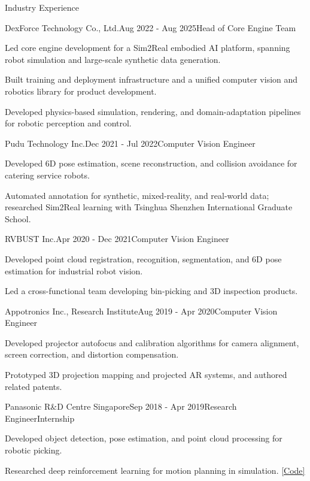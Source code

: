\documentclass{resume}
\begin{document}
\begin{rSection}{Industry Experience}
\begin{rSubsection}{DexForce Technology Co., Ltd.}{Aug 2022 - Aug 2025}{Head of Core Engine Team}{}
\item Led core engine development for a Sim2Real embodied AI platform, spanning robot simulation and large-scale synthetic data generation.
\item Built training and deployment infrastructure and a unified computer vision and robotics library for product development.
\item Developed physics-based simulation, rendering, and domain-adaptation pipelines for robotic perception and control.
\end{rSubsection}

\begin{rSubsection}{Pudu Technology Inc.}{Dec 2021 - Jul 2022}{Computer Vision Engineer}{}
\item Developed 6D pose estimation, scene reconstruction, and collision avoidance for catering service robots.
\item Automated annotation for synthetic, mixed-reality, and real-world data; researched Sim2Real learning with Tsinghua Shenzhen International Graduate School.
\end{rSubsection}

\begin{rSubsection}{RVBUST Inc.}{Apr 2020 - Dec 2021}{Computer Vision Engineer}{}
\item Developed point cloud registration, recognition, segmentation, and 6D pose estimation for industrial robot vision.
\item Led a cross-functional team developing bin-picking and 3D inspection products.
\end{rSubsection}

\begin{rSubsection}{Appotronics Inc., Research Institute}{Aug 2019 - Apr 2020}{Computer Vision Engineer}{}
\item Developed projector autofocus and calibration algorithms for camera alignment, screen correction, and distortion compensation.
\item Prototyped 3D projection mapping and projected AR systems, and authored related patents.
\end{rSubsection}

\begin{rSubsection}{Panasonic R\&D Centre Singapore}{Sep 2018 - Apr 2019}{Research Engineer}{Internship}
\item Developed object detection, pose estimation, and point cloud processing for robotic picking.
\item Researched deep reinforcement learning for motion planning in simulation. \href{https://github.com/yuecideng/Ur5\_DRL}{[Code]}
\end{rSubsection}

\end{rSection}
\end{document}
